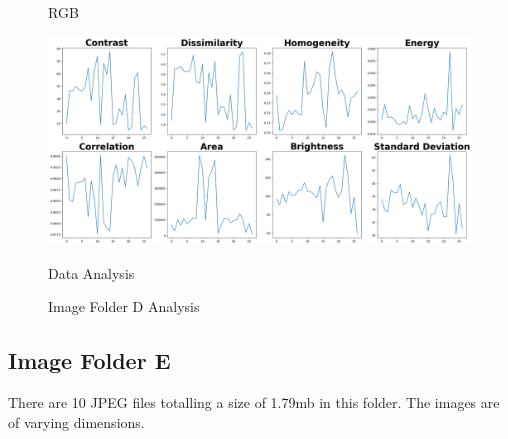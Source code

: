 \begin{figure}[ht]
\begin{minipage}[t]{0.25\textwidth}
        \caption*{RGB}
    \end{minipage}\hfill
    \begin{minipage}[t]{0.50\textwidth}
        \centering
        \includegraphics[width=\textwidth]{Figures/EDA_Charts/5/da.png}
        \caption*{Data Analysis}
    \end{minipage}
    \caption{Image Folder D Analysis}
    \label{fig:Image Folder D Analysis}
\end{figure}

\newpage

\subsection{Image Folder E}

There are 10 JPEG files totalling a size of 1.79mb in this folder. The images are of varying dimensions.

